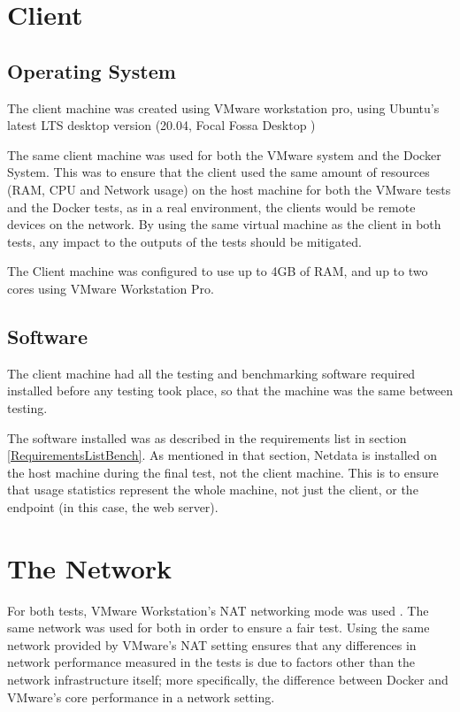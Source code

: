 \section{Client}
\subsection{Operating System}
\label{ClientOS}
The client machine was created using VMware workstation pro, using Ubuntu's latest LTS desktop version (20.04, Focal Fossa Desktop \citep{UbuntuDesktopDocumentation})

The same client machine was used for both the VMware system and the Docker System. This was to ensure that the client used the same amount of resources (RAM, CPU and Network usage) on the host machine for both the VMware tests and the Docker tests, as in a real environment, the clients would be remote devices on the network. By using the same virtual machine as the client in both tests, any impact to the outputs of the tests should be mitigated.

The Client machine was configured to use up to 4GB of RAM, and up to two cores using VMware Workstation Pro.

\subsection{Software}
The client machine had all the testing and benchmarking software required installed before any testing took place, so that the machine was the same between testing.

The software installed was as described in the requirements list in section \ref{RequirementsListBench}. As mentioned in that section, Netdata is installed on the host machine during the final test, not the client machine. This is to ensure that usage statistics represent the whole machine, not just the client, or the endpoint (in this case, the web server).

\section{The Network}
For both tests, VMware Workstation's NAT networking mode was used \citep{VMwareNAT}. The same network was used for both in order to ensure a fair test. Using the same network provided by VMware's NAT setting ensures that any differences in network performance measured in the tests is due to factors other than the network infrastructure itself; more specifically, the difference between Docker and VMware's core performance in a network setting.

